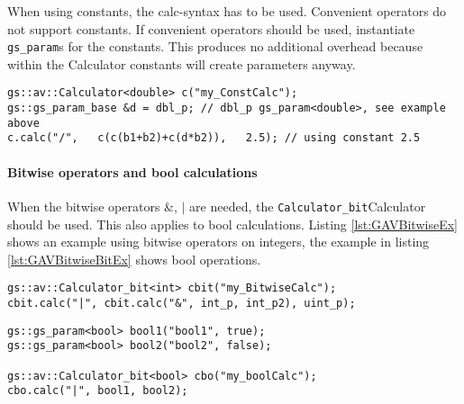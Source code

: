 When using constants, the calc-syntax has to be used. Convenient operators do not support constants. If convenient operators should be used, instantiate \lstinline|gs_param|s for the constants. This produces no additional overhead because within the Calculator constants will create parameters anyway.

\noindent
\begin{minipage}{\textwidth}
\begin{lstlisting}[caption={	Constants example: Calculator type: {\sffamily double}, formula: $(((b1 + b2) + (d * b2))  / 2.5)$}, label=lst:GAVConstEx]
gs::av::Calculator<double> c("my_ConstCalc");
gs::gs_param_base &d = dbl_p; // dbl_p gs_param<double>, see example above
c.calc("/",   c(c(b1+b2)+c(d*b2)),   2.5); // using constant 2.5
\end{lstlisting}
\end{minipage}

\paragraph{Bitwise operators and bool calculations}
When the bitwise operators \colorbox{hellgrau}{$\&$}, \colorbox{hellgrau}{$|$} are needed, the \lstinline|Calculator_bit|Calculator should be used. This also applies to bool calculations. Listing \ref{lst:GAVBitwiseEx} shows an example using bitwise operators on integers, the example in listing \ref{lst:GAVBitwiseBitEx} shows bool operations.

\noindent
\begin{minipage}{\textwidth}
\begin{lstlisting}[caption={
	Example using bitwise operations:\newline
	Calculator type: {\em bit}, {\sffamily int}, formula: $((int\_p \& int\_p2) | uint\_p)$}, label=lst:GAVBitwiseEx]
gs::av::Calculator_bit<int> cbit("my_BitwiseCalc");
cbit.calc("|", cbit.calc("&", int_p, int_p2), uint_p);
\end{lstlisting}
\end{minipage}

\noindent
\begin{minipage}{\textwidth}
\begin{lstlisting}[caption={
	Example bool operations: %\newline
	Calculator type: {\em bit}, {\sffamily bool}, formula: $(bool1 | bool2)$}, label=lst:GAVBitwiseBitEx]
gs::gs_param<bool> bool1("bool1", true);
gs::gs_param<bool> bool2("bool2", false);

gs::av::Calculator_bit<bool> cbo("my_boolCalc");
cbo.calc("|", bool1, bool2);
\end{lstlisting}
\end{minipage}

